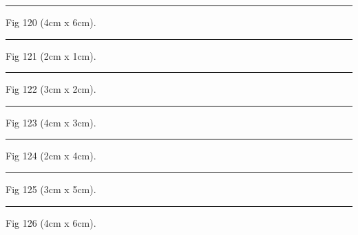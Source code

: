 \documentclass[a4paper,11pt]{article}
\begin{document}
\begin{swarmwrap}%
  \begin{minipage}[t]{4cm}
    \centering
    \rule{\linewidth}{6cm}
    {\footnotesize Fig 120 (4cm x 6cm).}
  \end{minipage}%
\end{swarmwrap}%
\swarmwrapnext
\lipsum[120]%

\begin{swarmwrap}%
  \begin{minipage}[t]{2cm}
    \centering
    \rule{\linewidth}{1cm}
    {\footnotesize Fig 121 (2cm x 1cm).}
  \end{minipage}%
\end{swarmwrap}%
\swarmwrapnext
\lipsum[121]%

\begin{swarmwrap}%
  \begin{minipage}[t]{3cm}
    \centering
    \rule{\linewidth}{2cm}
    {\footnotesize Fig 122 (3cm x 2cm).}
  \end{minipage}%
\end{swarmwrap}%
\swarmwrapnext
\lipsum[122]%

\begin{swarmwrap}%
  \begin{minipage}[t]{4cm}
    \centering
    \rule{\linewidth}{3cm}
    {\footnotesize Fig 123 (4cm x 3cm).}
  \end{minipage}%
\end{swarmwrap}%
\swarmwrapnext
\lipsum[123]%

\begin{swarmwrap}%
  \begin{minipage}[t]{2cm}
    \centering
    \rule{\linewidth}{4cm}
    {\footnotesize Fig 124 (2cm x 4cm).}
  \end{minipage}%
\end{swarmwrap}%
\swarmwrapnext
\lipsum[124]%

\begin{swarmwrap}%
  \begin{minipage}[t]{3cm}
    \centering
    \rule{\linewidth}{5cm}
    {\footnotesize Fig 125 (3cm x 5cm).}
  \end{minipage}%
\end{swarmwrap}%
\swarmwrapnext
\lipsum[125]%

\begin{swarmwrap}%
  \begin{minipage}[t]{4cm}
    \centering
    \rule{\linewidth}{6cm}
    {\footnotesize Fig 126 (4cm x 6cm).}
  \end{minipage}%
\end{swarmwrap}%
\swarmwrapnext
\lipsum[126]%
\end{document}
